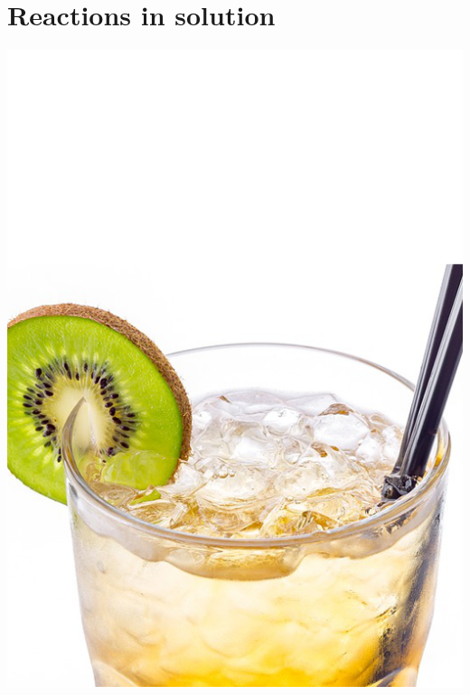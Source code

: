 \documentclass[main.tex]{subfiles}
\begin{document}
\linenumbers


\chapter[Reactions in solution  ]{Reactions in solution }

\begin{marginfigure}
      \includegraphics{chapter9/figure1}
   \end{marginfigure}
\end{document}
